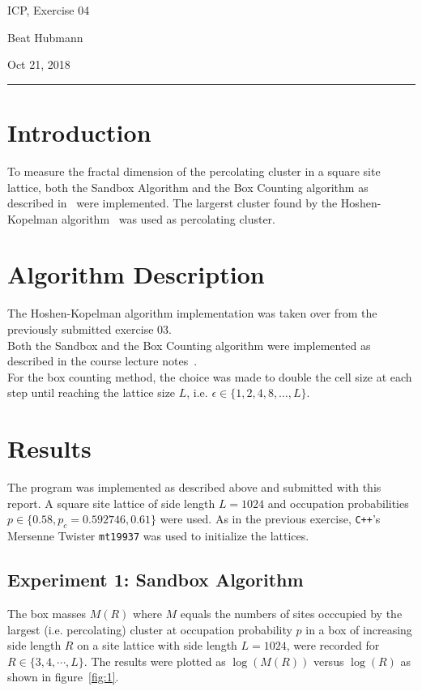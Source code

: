 \documentclass[11pt,a4paper]{article}
\begin{document}
\noindent\parbox{\linewidth}{
 \parbox{.25\linewidth}{ \large ICP, Exercise 04 }\hfill
 \parbox{.5\linewidth}{\begin{center} \large Beat Hubmann \end{center}}\hfill
 \parbox{.2\linewidth}{\begin{flushright} \large Oct 21, 2018 \end{flushright}}
}
\noindent\rule{\linewidth}{2pt}


\section{Introduction}

To measure the fractal dimension of the percolating cluster in a square site lattice, both the Sandbox Algorithm and the Box Counting algorithm as described in~\cite{herrmann} were implemented. The largerst cluster found by the Hoshen-Kopelman algorithm~\cite{hoshen} was used as percolating cluster.

\section{Algorithm Description}
The Hoshen-Kopelman algorithm implementation was taken over from the previously submitted exercise 03.\\
Both the Sandbox and the Box Counting algorithm were implemented as described in the course lecture notes~\cite{herrmann}.\\
For the box counting method, the choice was made to double the cell size at each step until reaching the lattice size $L$, i.e. $\epsilon \in \{1, 2, 4, 8, \ldots, L\}$.

\section{Results}


The program was implemented as described above and submitted with this report. 
A square site lattice of side length $L=1024$ and occupation probabilities $p \in \{0.58, p_c=0.592746, 0.61\}$ were used.
As in the previous exercise, \texttt{C++}'s Mersenne Twister \texttt{mt19937} was used to initialize the lattices.

\subsection{Experiment 1: Sandbox Algorithm}
The box masses $M(R)$ where $M$ equals the numbers of sites occcupied by the largest (i.e. percolating) cluster at occupation probability $p$ in a box of increasing side length $R$ on a site lattice with side length $L=1024$, were recorded for $R \in \{3, 4, \cdots, L\}$. The results were plotted as $\log(M(R))$ versus $\log(R)$ as shown in figure~\ref{fig:1}.
\end{document}
